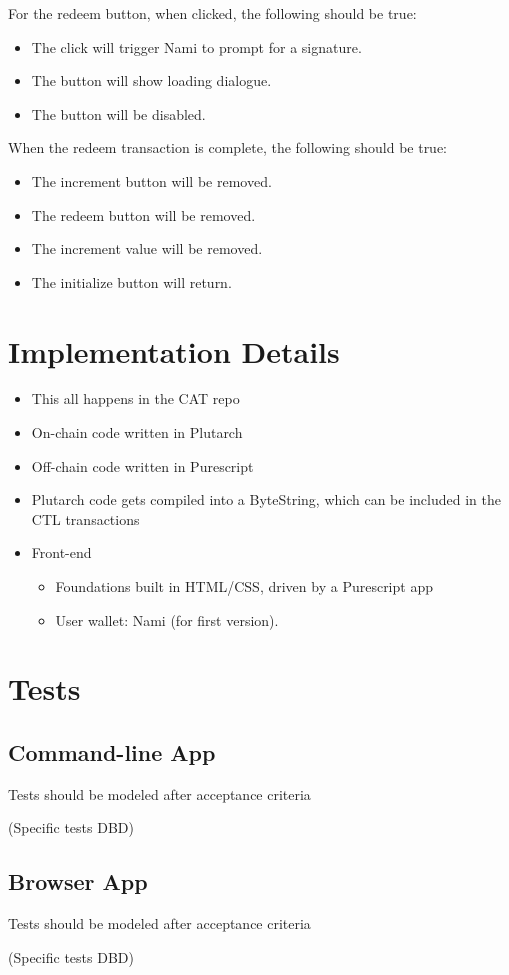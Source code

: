 \documentclass{article}
\begin{document}
For the redeem button, when clicked, the following should be true:

\begin{itemize}
  \item The click will trigger Nami to prompt for a signature.
  \item The button will show loading dialogue.
  \item The button will be disabled.
\end{itemize}

When the redeem transaction is complete, the following should be true:

\begin{itemize}
  \item The increment button will be removed.
  \item The redeem button will be removed.
  \item The increment value will be removed.
  \item The initialize button will return.
\end{itemize}


\section{Implementation Details}

\begin{itemize}
  \item This all happens in the CAT repo
  \item On-chain code written in Plutarch
  \item Off-chain code written in Purescript
  \item Plutarch code gets compiled into a ByteString, which can be included in
    the CTL transactions
  \item Front-end
  \begin{itemize}
    \item Foundations built in HTML/CSS, driven by a Purescript app
    \item User wallet: Nami (for first version).
  \end{itemize}

\end{itemize}

\section{Tests}

\subsection{Command-line App}

Tests should be modeled after acceptance criteria

(Specific tests DBD)

\subsection{Browser App}

Tests should be modeled after acceptance criteria

(Specific tests DBD)
\end{document}
